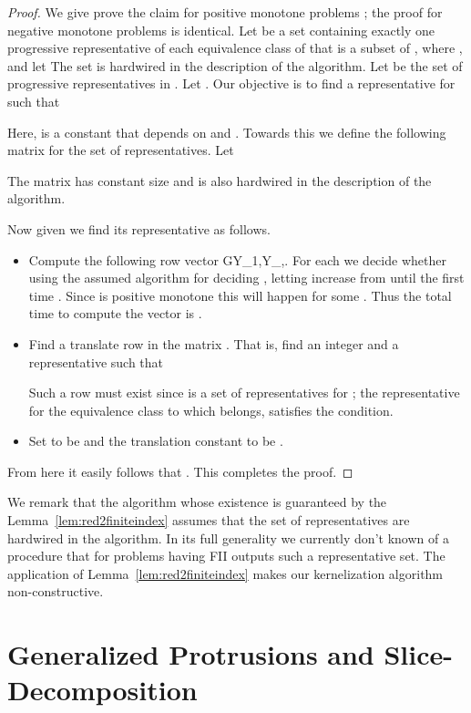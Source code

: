 \documentclass[11pt]{article}
\begin{document}
\begin{proof}
We give prove the claim for positive monotone problems ; the proof for negative monotone problems is identical. 
Let    be
a set containing exactly one progressive representative of each equivalence class of  that is a subset of 
, where , and  let   The set   is hardwired in the description of the algorithm. 
 Let  be the set of progressive representatives in . Let . Our objective is to find 
  a representative   for   such that 
 
Here,  is a constant  that depends on  and .  Towards this   
we define the following matrix for the set of representatives. Let 

The matrix  has constant size and is also hardwired in the description of the algorithm. 


Now given  we find its representative as follows. 
\begin{itemize}
\item Compute the following row vector G\oplus Y_1,\PiG\oplus Y_\rho,\Pi. For each  we decide whether  using the assumed algorithm for deciding 
,  letting  increase from  until the first time . Since  is positive monotone this will happen for some 
. Thus the total time to compute the vector  is . 

\item Find a translate row in the matrix . That is, find an integer  and a representative 
 such that  

Such a row must exist since  is  a set of representatives for ; the representative  for the equivalence class to which  belongs, satisfies the condition.  
\item Set  to be  and the translation constant to be .
\end{itemize}
From here it easily follows that . This completes the proof.  
\end{proof}
 We remark that the algorithm whose existence is guaranteed by the Lemma~\ref{lem:red2finiteindex} assumes that the set   of representatives  are hardwired in the algorithm.  In its full generality we currently don't known of a procedure that for problems having FII outputs such a representative set. The application of Lemma~\ref{lem:red2finiteindex}  makes our kernelization algorithm non-constructive.  












\section{Generalized  Protrusions and Slice-Decomposition}\label{sec:slicedecs}
\end{document}
